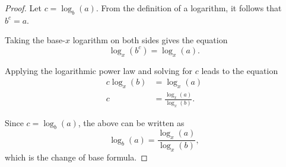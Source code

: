 \documentclass[parskip]{scrartcl}
\begin{document}
\begin{proof}
  Let \(c = \log_{b}(a)\). From the definition of a logarithm, it follows that
  \(b^c = a\).

  Taking the base-\(x\) logarithm on both sides gives the equation
  \begin{equation*}
    \log_{x}(b^c) = \log_{x}(a).
  \end{equation*}

  Applying the logarithmic power law and solving for \(c\) leads to the equation
  \begin{equation*}
    \begin{split}
      c\log_{x}(b) &= \log_{x}(a) \\
      c &= \frac{\log_{x}(a)}{\log_{x}(b)}.
    \end{split}
  \end{equation*}

  Since \(c = \log_{b}(a)\), the above can be written as
  \begin{equation*}
    \log_{b}(a) = \frac{\log_{x}(a)}{\log_{x}(b)},
  \end{equation*}
  which is the change of base formula.
\end{proof}
\end{document}
